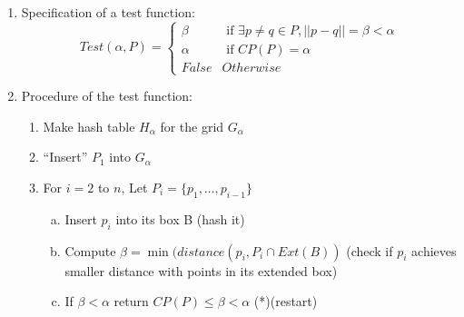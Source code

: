 \documentclass[12pt]{article}
\newcommand{\fref}[1]{Figure \ref{#1}}
\begin{document}
\begin{enumerate}
\begin{lemma}
  Box B with side length $\alpha$, if
  $\alpha \leq CP(P), P \subseteq B$ then $|P| \leq 4$
\end{lemma}
\begin{proof}
  Split B into 4 ${\alpha \over 2} \times{\alpha \over 2}$
  boxes. $diameter(B_i) = {\alpha \over \sqrt{2}} < \alpha$, so each
  sub-divided box contains at most 1 point (\fref{fig:packing}).
  \begin{figure}[h!]
    \centering
    \texttt{[image: packing.png]}
    \caption{Packing lemma sub-divided boxes}
    \label{fig:packing}
  \end{figure}
\end{proof}

\item Specification of a test function:
\[
  Test(\alpha, P) =
  \begin{cases}
    \beta &  \text{ if } \exists p \neq q \in P, ||p - q|| = \beta < \alpha \\
    \alpha & \text{ if } CP(P) = \alpha \\
    False &Otherwise
  \end{cases}
\]
\item Procedure of the test function:
  \begin{enumerate}[1)]
  \item Make hash table $H_\alpha$ for the grid $G_\alpha$
  \item ``Insert'' $P_1$ into $G_\alpha$
  \item For $i = 2$ to $n$, Let $P_i = \{p_1, \dots, p_{i - 1}\}$
    \begin{enumerate}[a)]
    \item Insert $p_i$ into its box B (hash it)
    \item Compute $\beta = \min(distance(p_i, P_i \cap Ext(B))$ (check
      if $p_i$ achieves smaller distance with points in its extended
      box)
    \item If $\beta < \alpha$ return $CP(P) \leq \beta < \alpha$
      (*)(restart)


\end{enumerate}
\end{enumerate}
\end{enumerate}
\end{document}
